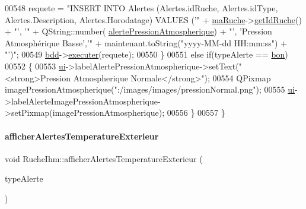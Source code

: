 \begin{DoxyCode}
00548         requete = \textcolor{stringliteral}{"INSERT INTO Alertes (Alertes.idRuche, Alertes.idType, Alertes.Description,
       Alertes.Horodatage) VALUES ('"} + \hyperlink{class_ruche_ihm_a43a6b1fa31f4fba58d919daae3707b38}{maRuche}->\hyperlink{class_ruche_a9f2de5ef29557ec7a53d5e22df34d164}{getIdRuche}() + \textcolor{stringliteral}{"', '"} + QString::number(
      \hyperlink{parametres_8h_a83a725fd153179a2bd97afcc8307737ba3b3b9fe16ae965531aca47449d865ce1}{alertePressionAtmospherique}) + \textcolor{stringliteral}{"', 'Pression Atmosphérique Basse','"} + 
      maintenant.toString(\textcolor{stringliteral}{"yyyy-MM-dd  HH:mm:ss"}) + \textcolor{stringliteral}{"')"};
00549         \hyperlink{class_ruche_ihm_a0851936fe212e8d40538264f09749153}{bdd}->\hyperlink{class_base_de_donnees_aa8de5f8f8bb17edc43f5c0ee33712081}{executer}(requete);
00550     \}
00551     \textcolor{keywordflow}{else} \textcolor{keywordflow}{if}(typeAlerte == \hyperlink{parametres_8h_aaa6de8207c94675264c90b10b613368da5ac8ec3b54d90a07c6bb5a77ef971821}{bon})
00552     \{
00553         \hyperlink{class_ruche_ihm_a64786058bd7f88ca2f1e9743bb27c25b}{ui}->labelAlertePressionAtmospherique->setText(\textcolor{stringliteral}{"<strong>Pression Atmospherique Normale</strong>"});
00554         QPixmap imagePressionAtmospherique(\textcolor{stringliteral}{":/images/images/pressionNormal.png"});
00555         \hyperlink{class_ruche_ihm_a64786058bd7f88ca2f1e9743bb27c25b}{ui}->labelAlerteImagePressionAtmospherique->setPixmap(imagePressionAtmospherique);
00556     \}
00557 \}
\end{DoxyCode}
\mbox{\label{class_ruche_ihm_ada4be5a54f7fa57de6190d44e3cfcb82}} 
\paragraph{\texorpdfstring{afficher\+Alertes\+Temperature\+Exterieur}{afficherAlertesTemperatureExterieur}}
{\footnotesize\ttfamily void Ruche\+Ihm\+::afficher\+Alertes\+Temperature\+Exterieur (\begin{DoxyParamCaption}\item[{\hyperlink{parametres_8h_aaa6de8207c94675264c90b10b613368d}{Seuils\+Alertes}}]{type\+Alerte }\end{DoxyParamCaption})\hspace{0.3cm}{\ttfamily [slot]}}



